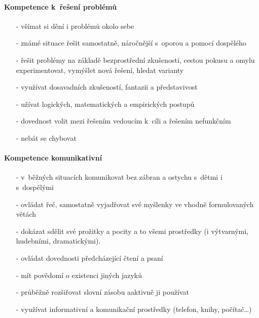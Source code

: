 				\paragraph{Kompetence k řešení problémů}
				\begin{itemize}
				\setlength\itemsep{-2mm}
				\item[-] všímat si dění i problémů okolo sebe
				\item[-] známé situace řešit samostatně, náročnější s oporou a pomocí dospělého
				\item[-] řešit problémy  na základě bezprostřední zkušenosti, cestou pokusu a omylu experimentovat, vymýšlet nová řešení, hledat varianty
				\item[-] využívat dosavadních zkušeností, fantazii a představivost 
				\item[-] užívat logických, matematických a empirických postupů 
				\item[-] dovednost volit mezi řešením vedoucím k cíli a řešením nefunkčním
				\item[-] nebát se chybovat
				\end{itemize}
				

				\paragraph{Kompetence komunikativní}
				\begin{itemize}
				\setlength\itemsep{-2mm}
				\item[-] v běžných situacích komunikovat bez zábran a ostychu s dětmi i s dospělými
				\item[-] ovládat řeč, samostatně vyjadřovat své myšlenky ve vhodně formulovaných větách
				\item[-] dokázat sdělit své prožitky a pocity a to všemi prostředky (i výtvarnými, hudebními, dramatickými). 
				\item[-] ovládat dovednosti předcházející čtení a psaní 
				\item[-] mít povědomí o existenci jiných jazyků
				\item[-] průběžně rozšiřovat slovní zásobu aaktivně ji používat
				\item[-] využívat informativní a komunikační prostředky (telefon, knihy, počítač…)
				\end{itemize}

